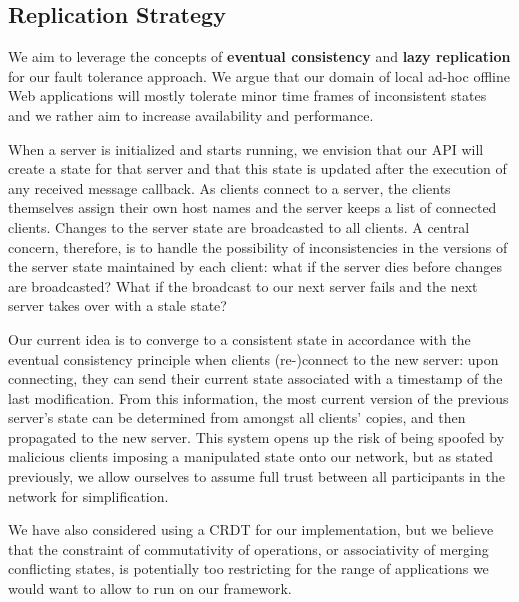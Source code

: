 \subsection{Replication Strategy}

We aim to leverage the concepts of \textbf{eventual consistency} and \textbf{lazy replication} for our fault tolerance approach. 
We argue that our domain of local ad-hoc offline Web applications will mostly tolerate minor time frames of inconsistent states and we rather aim to increase availability and performance.

When a server is initialized and starts running, we envision that our API will create a state for that server and that this state is updated after the execution of any received message callback. 
As clients connect to a server, the clients themselves assign their own host names and the server keeps a list of connected clients.
Changes to the server state are broadcasted to all clients. 
A central concern, therefore, is to handle the possibility of inconsistencies in the versions of the server state maintained by each client: what if the server dies before changes are broadcasted? 
What if the broadcast to our next server fails and the next server takes over with a stale state? 

Our current idea is to converge to a consistent state in accordance with the eventual consistency principle when clients (re-)connect to the new server: upon connecting, they can send their current state associated with a timestamp of the last modification.
From this information, the most current version of the previous server's state can be determined from amongst all clients' copies, and then propagated to the new server.
This system opens up the risk of being spoofed by malicious clients imposing a manipulated state onto our network, but as stated previously, we allow ourselves to assume full trust between all participants in the network for simplification.
 
We have also considered using a CRDT for our implementation, but we believe that the constraint of commutativity of operations, or associativity of merging conflicting states, is potentially too restricting for the range of applications we would want to allow to run on our framework.
